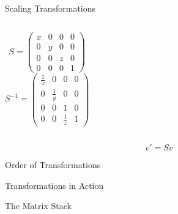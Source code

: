\documentclass[xcolor=dvipsnames,t]{beamer}
\newcommand{\showcode}[1]{\begin{mdframed}[style=code] %
                          \end{mdframed}%
}
\begin{document}
\begin{frame}{Scaling Transformations} 
    \showcode{scale.c} 
    \begin{columns}[t]
            \begin{equation*}
                S = \left(
                        \begin{array}{cccc}
                            x   & 0     & 0     & 0 \\
                            0   & y     & 0     & 0 \\
                            0   & 0     & z     & 0 \\
                            0   & 0     & 0     & 1
                        \end{array} 
                    \right)
            \end{equation*} 
            \begin{equation*}
               S^{-1} = \left(
                        \begin{array}{cccc}
                            \frac{1}{x} & 0             & 0             & 0 \\
                            0           & \frac{1}{y}   & 0             & 0 \\
                            0           & 0             & 1             & 0 \\
                            0           & 0             & \frac{1}{z}   & 1
                        \end{array} 
                    \right)
            \end{equation*} 
    \end{columns} 
    \begin{equation*}
        v' = S v
    \end{equation*} 
\end{frame} 

\begin{frame}{Order of Transformations}
\end{frame} 

\begin{frame}{Transformations in Action}
\end{frame} 

\begin{frame}{The Matrix Stack} 
\end{frame} 
\end{document}
